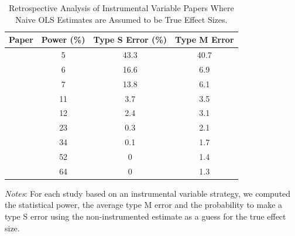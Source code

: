 \documentclass[12pt]{article}
\begin{document}
\begin{table}[h!]
\caption{Retrospective Analysis of Instrumental Variable Papers Where Naive OLS Estimates are Assumed to be True Effect Sizes.}
\begin{threeparttable}
\label{tab:retro_iv}
\begin{tabular}{lccc}
\toprule
\textbf{Paper}                    & \textbf{Power (\%)} & \textbf{Type S Error (\%)} & \textbf{Type M Error} \\ \midrule
\rowcolor{Gray}
\cite{giaccherini2021particulate} & 5                      & 43.3                 & 40.7                          \\
\cite{halliday_vog_2019}   & 6                & 16.6                & 6.9                           \\
\rowcolor{Gray}
\cite{schlenker_airports_2016}   & 7                   & 13.8                 & 6.1                           \\
\cite{moretti_pollution_2011}    & 11                  & 3.7                  & 3.5                           \\
\rowcolor{Gray}
\cite{arceo_does_2016} & 12                   & 2.4                  & 3.1                           \\
\cite{barwick_morbidity_2018}     & 23                   & 0.3                  & 2.1                           \\
\rowcolor{Gray}
\cite{deryugina_mortality_2019}   & 34                  & 0.1                  & 1.7                           \\
\cite{ebenstein_particulate_2015}   & 52                   & 0                    & 1.4                           \\
\rowcolor{Gray}
\cite{schwartz_national_2018}   & 64                     & 0                    & 1.3                           \\ \bottomrule
\end{tabular}
\begin{tablenotes}
\footnotesize
\item \textit{Notes}: For each study based on an instrumental variable strategy, we computed the statistical power, the average type M error and the probability to make a type S error using the non-instrumented estimate as a guess for the true effect size.
\end{tablenotes}
\end{threeparttable}
\end{table}
\end{document}
